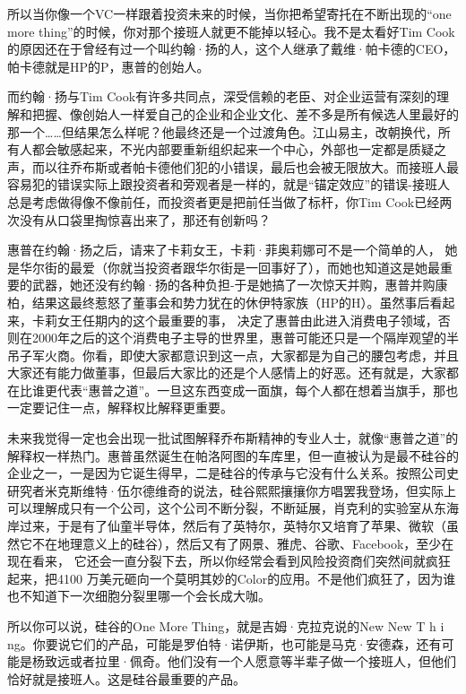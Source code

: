 所以当你像一个VC一样跟着投资未来的时候，当你把希望寄托在不断出现的``one
more thing''的时候，你对那个接班人就更不能掉以轻心。我不是太看好Tim
Cook的原因还在于曾经有过一个叫约翰·扬的人，这个人继承了戴维·帕卡德的CEO，帕卡德就是HP的P，惠普的创始人。

而约翰·扬与Tim
Cook有许多共同点，深受信赖的老臣、对企业运营有深刻的理解和把握、像创始人一样爱自己的企业和企业文化、差不多是所有候选人里最好的那一个\ldots{}\ldots{}但结果怎么样呢？他最终还是一个过渡角色。江山易主，改朝换代，所有人都会敏感起来，不光内部要重新组织起来一个中心，外部也一定都是质疑之声，而以往乔布斯或者帕卡德他们犯的小错误，最后也会被无限放大。而接班人最容易犯的错误实际上跟投资者和旁观者是一样的，就是``锚定效应''的错误-接班人总是考虑做得像不像前任，而投资者更是把前任当做了标杆，你Tim
Cook已经两次没有从口袋里掏惊喜出来了，那还有创新吗？

惠普在约翰·扬之后，请来了卡莉女王，卡莉·菲奥莉娜可不是一个简单的人，
她是华尔街的最爱（你就当投资者跟华尔街是一回事好了），而她也知道这是她最重要的武器，她还没有约翰·扬的各种负担-于是她搞了一次惊天并购，惠普并购康柏，结果这最终惹怒了董事会和势力犹在的休伊特家族（HP的H）。虽然事后看起来，卡莉女王任期内的这个最重要的事，
决定了惠普由此进入消费电子领域，否则在2000年之后的这个消费电子主导的世界里，惠普可能还只是一个隔岸观望的半吊子军火商。你看，即使大家都意识到这一点，大家都是为自己的腰包考虑，并且大家还有能力做董事，但最后大家比的还是个人感情上的好恶。还有就是，大家都在比谁更代表``惠普之道''。一旦这东西变成一面旗，每个人都在想着当旗手，那也一定要记住一点，解释权比解释更重要。

未来我觉得一定也会出现一批试图解释乔布斯精神的专业人士，就像``惠普之道''的解释权一样热门。惠普虽然诞生在帕洛阿图的车库里，但一直被认为是最不硅谷的企业之一，一是因为它诞生得早，二是硅谷的传承与它没有什么关系。按照公司史研究者米克斯维特·伍尔德维奇的说法，硅谷熙熙攘攘你方唱罢我登场，但实际上可以理解成只有一个公司，这个公司不断分裂，不断延展，肖克利的实验室从东海岸过来，于是有了仙童半导体，然后有了英特尔，英特尔又培育了苹果、微软（虽然它不在地理意义上的硅谷），然后又有了网景、雅虎、谷歌、Facebook，至少在现在看来，
它还会一直分裂下去，所以你经常会看到风险投资商们突然间就疯狂起来，把4100
万美元砸向一个莫明其妙的Color的应用。不是他们疯狂了，因为谁也不知道下一次细胞分裂里哪一个会长成大咖。

所以你可以说，硅谷的One More Thing，就是吉姆·克拉克说的New New T h i
ng。你要说它们的产品，可能是罗伯特·诺伊斯，也可能是马克·安德森，还有可能是杨致远或者拉里·佩奇。他们没有一个人愿意等半辈子做一个接班人，但他们恰好就是接班人。这是硅谷最重要的产品。

